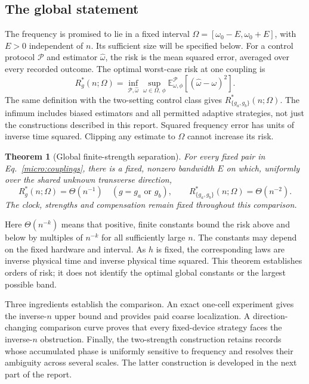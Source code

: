 \documentclass[11pt,a4paper]{article}
\numberwithin{equation}{section}
\newtheorem{theorem}{Theorem}[section]
\theoremstyle{remark}
\begin{document}
\subsection{The global statement}

The frequency is promised to lie in a fixed interval
$\Omega=[\omega_0-E,\omega_0+E]$, with $E>0$ independent of $n$.
Its sufficient size will be specified below. For a control protocol
$\mathcal P$ and estimator $\widehat\omega$, the risk is the mean squared
error, averaged over every recorded outcome. The optimal worst-case risk
at one coupling is
\begin{equation}
 R_g^*(n;\Omega)
 =\inf_{\mathcal P,\widehat\omega}
   \sup_{\omega\in\Omega,\,\phi}
   \mathbb E_{\omega,\phi}^{\mathcal P}
       [ (\widehat\omega-\omega)^2 ].
 \label{micro:risk}
\end{equation}
The same definition with the two-setting control class gives
$R_{\{g_a,g_b\}}^*(n;\Omega)$. The infimum includes biased estimators and
all permitted adaptive strategies, not just the constructions described
in this report. Squared frequency error has units of inverse time squared.
Clipping any estimate to $\Omega$ cannot increase its risk.

\begin{theorem}[Global finite-strength separation]
\label{micro:theorem}
For every fixed pair in Eq.~\eqref{micro:couplings}, there is a fixed,
nonzero bandwidth $E$ on which, uniformly over the shared unknown
transverse direction,
\begin{equation}
 \boxed{\quad
 R_g^*(n;\Omega)=\Theta(n^{-1})\quad(g=g_a\text{ or }g_b),
 \qquad
 R_{\{g_a,g_b\}}^*(n;\Omega)=\Theta(n^{-2}).\quad}
 \label{micro:separation}
\end{equation}
The clock, strengths and compensation remain fixed throughout this
comparison.
\end{theorem}
Here $\Theta(n^{-k})$ means that positive, finite constants bound the risk
above and below by multiples of $n^{-k}$ for all sufficiently large $n$.
The constants may depend on the fixed hardware and interval. As $h$ is
fixed, the corresponding laws are inverse physical time and inverse
physical time squared. This theorem establishes orders of risk; it does
not identify the optimal global constants or the largest possible band.

Three ingredients establish the comparison. An exact one-cell experiment
gives the inverse-$n$ upper bound and provides paid coarse localization.
A direction-changing comparison curve proves that every fixed-device
strategy faces the inverse-$n$ obstruction. Finally, the two-strength
construction retains records whose accumulated phase is uniformly
sensitive to frequency and resolves their ambiguity across several
scales. The latter construction is developed in the next part of the
report.
\end{document}
